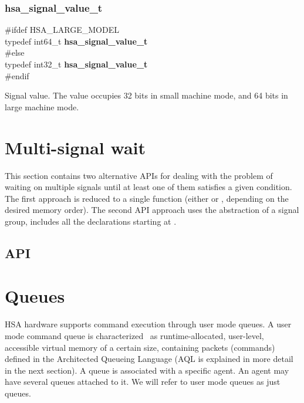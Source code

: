 \documentclass[oneside]{book}
\newenvironment{mylongtable}{\rowcolors{0}{lightgray}{lightgray}\longtable} {
\endlongtable}
\begin{document}
\subsubsection{hsa_\-signal_\-value_\-t}
\vspace{-3.5mm}\begin{mylongtable}{@{}p{\textwidth}}
\rule{0pt}{3ex}\hypertarget{group__signals_1ga67ca2818879c9990e1b5f1b14ce7ed27}{}
\#ifdef HSA_LARGE_MODEL\\
\hspace{1.7em}typedef int64_\-t  \textbf{hsa_\-signal_\-value_\-t}\\
\#else \\
\hspace{1.7em}typedef int32_\-t  \textbf{hsa_\-signal_\-value_\-t}\\
\#endif\rule[-2ex]{0pt}{0pt}
\end{mylongtable}
\vspace{-3mm}Signal value. The value occupies 32 bits in small machine mode, and 64 bits in large machine mode.
\\



\section{Multi-signal wait}
This section contains two alternative APIs for dealing with the problem of
waiting on multiple signals until at least one of them satisfies a given
condition. The first approach is reduced to a single function (either
 or
, depending on the desired memory
order). The second API approach uses the abstraction of a signal group, includes
all the declarations starting at .
\subsection{API}



\section{Queues} \label{sec:queues}

HSA hardware supports command execution through user mode queues. A user mode
command queue is characterized~\cite{sar} as runtime-allocated, user-level,
accessible virtual memory of a certain size, containing packets (commands)
defined in the Architected Queueing Language (AQL is explained in more detail in
the next section). A queue is associated with a specific agent. An agent may
have several queues attached to it. We will refer to user mode queues as just
queues.
\end{document}
